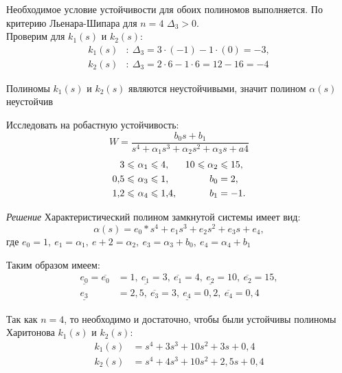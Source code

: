 \documentclass[../../TAU.tex]{subfiles}
\begin{document}
    Необходимое условие устойчивости для обоих полиномов выполняется. По критерию Льенара-Шипара для $n=4$ $\Delta_3>0$.\\
    Проверим для ${k}_1(s)$ и ${k}_2(s)$:
    \begin{align*}
        {k}_1(s)&:\ \Delta_3=3\cdot(-1)-1\cdot(0)=-3,\\
        {k}_2(s)&:\ \Delta_3=2\cdot6-1\cdot6=12-16=-4
    \end{align*}

    Полиномы ${k}_1(s)$ и ${k}_2(s)$ являются неустойчивыми, значит полином $\alpha(s)$ неустойчив

    \examp Исследовать на робастную устойчивость:
    $$
    W=\frac{b_0s+b_1}{s^4+\alpha_1s^3+\alpha_2s^2+\alpha_3s+a4}
    $$
    \begin{align*}
        3\leqslant\ &\alpha_1\leqslant4, & 10\leqslant \alpha_2&\leqslant15, \\
        0{,}5\leqslant\ &\alpha_3\leqslant1, & b_0&=2, \\
        1{,}2\leqslant\ &\alpha_4\leqslant1{,}4, & b_1&=-1.
    \end{align*}

    {\it Решение}
    Характеристический полином замкнутой системы имеет вид:
    $$
        \alpha(s)=e_0*s^4+e_1s^3+e_2s^2+e_3s+e_4,
    $$    
    где 
    $e_0=1,\ e_1=\alpha_1,\ e+2 =\alpha_2,\ e_3=\alpha_3+b_0,\ e_4=\alpha_4+b_1$

    Таким образом имеем:
    \begin{align*}
        \underline{e_0}=\overline{e_0}&=1,\ 
        \underline{e_1}=3,\ \overline{e_1}=4,\
        \underline{e_2}=10,\ \overline{e_2}=15,\\
        \underline{e_3}&=2{,}5,\ \overline{e_3}=3,\ 
        \underline{e_4}=0{,}2,\ \overline{e_4}=0{,}4
    \end{align*}

    Так как $n=4$, то необходимо и достаточно, чтобы были устойчивы полиномы  Харитонова 
    ${k}_1(s)$ и ${k}_2(s)$:
    \begin{align*}
        k_1(s)&=s^4+3s^3+10s^2+3s+0{,}4\\
        k_2(s)&=s^4+4s^3+10s^2+2{,}5s+0{,}4
    \end{align*}
\end{document}
